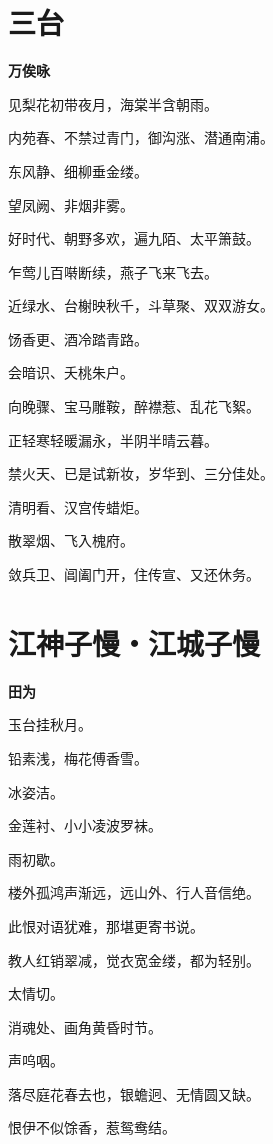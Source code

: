 \documentclass[12pt,a4paper]{ctexbook}
\begin{document}
\section{三台}
\textbf{万俟咏}\par\vspace{0.5em}
见梨花初带夜月，海棠半含朝雨。\par
内苑春、不禁过青门，御沟涨、潜通南浦。\par
东风静、细柳垂金缕。\par
望凤阙、非烟非雾。\par
好时代、朝野多欢，遍九陌、太平箫鼓。\par
乍莺儿百啭断续，燕子飞来飞去。\par
近绿水、台榭映秋千，斗草聚、双双游女。\par
饧香更、酒冷踏青路。\par
会暗识、夭桃朱户。\par
向晚骤、宝马雕鞍，醉襟惹、乱花飞絮。\par
正轻寒轻暖漏永，半阴半晴云暮。\par
禁火天、已是试新妆，岁华到、三分佳处。\par
清明看、汉宫传蜡炬。\par
散翠烟、飞入槐府。\par
敛兵卫、阊阖门开，住传宣、又还休务。\par

\section{江神子慢・江城子慢}
\textbf{田为}\par\vspace{0.5em}
玉台挂秋月。\par
铅素浅，梅花傅香雪。\par
冰姿洁。\par
金莲衬、小小凌波罗袜。\par
雨初歇。\par
楼外孤鸿声渐远，远山外、行人音信绝。\par
此恨对语犹难，那堪更寄书说。\par
教人红销翠减，觉衣宽金缕，都为轻别。\par
太情切。\par
消魂处、画角黄昏时节。\par
声呜咽。\par
落尽庭花春去也，银蟾迥、无情圆又缺。\par
恨伊不似馀香，惹鸳鸯结。\par
\end{document}
